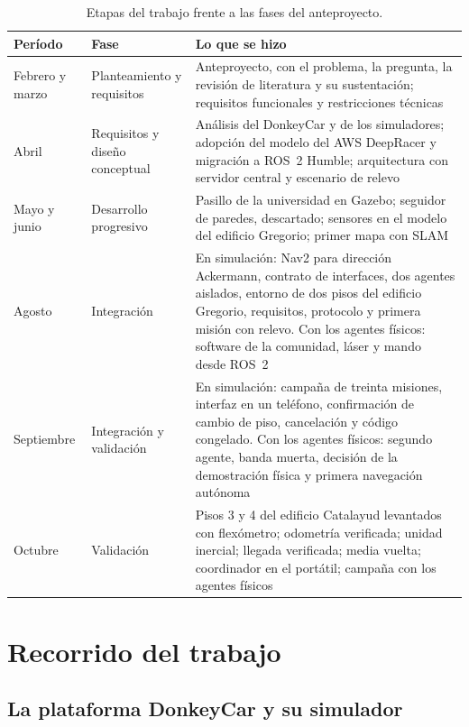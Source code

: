 \begin{table}[htbp]
  \caption{Etapas del trabajo frente a las fases del anteproyecto.}
  \label{tab:etapas}
  \footnotesize
  \begin{tabular}{@{}p{}p{}p{}@{}}
    \toprule
    \textbf{Período} & \textbf{Fase} & \textbf{Lo que se hizo} \\ \midrule
    Febrero y marzo & Planteamiento y requisitos & Anteproyecto, con el problema, la pregunta, la revisión de literatura y su sustentación; requisitos funcionales y restricciones técnicas \\ \addlinespace
    Abril & Requisitos y diseño conceptual & Análisis del DonkeyCar y de los simuladores; adopción del modelo del AWS DeepRacer y migración a ROS~2 Humble; arquitectura con servidor central y escenario de relevo \\ \addlinespace
    Mayo y junio & Desarrollo progresivo & Pasillo de la universidad en Gazebo; seguidor de paredes, descartado; sensores en el modelo del edificio Gregorio; primer mapa con SLAM \\ \addlinespace
    Agosto & Integración & En simulación: Nav2 para dirección Ackermann, contrato de interfaces, dos agentes aislados, entorno de dos pisos del edificio Gregorio, requisitos, protocolo y primera misión con relevo. Con los agentes físicos: software de la comunidad, láser y mando desde ROS~2 \\ \addlinespace
    Septiembre & Integración y validación & En simulación: campaña de treinta misiones, interfaz en un teléfono, confirmación de cambio de piso, cancelación y código congelado. Con los agentes físicos: segundo agente, banda muerta, decisión de la demostración física y primera navegación autónoma \\ \addlinespace
    Octubre & Validación & Pisos 3 y 4 del edificio Catalayud levantados con flexómetro; odometría verificada; unidad inercial; llegada verificada; media vuelta; coordinador en el portátil; campaña con los agentes físicos \\ \bottomrule
  \end{tabular}
\end{table}

\section{Recorrido del trabajo}
\label{sec:recorrido}

\subsection{La plataforma DonkeyCar y su simulador}
\label{sec:donkeycar}

